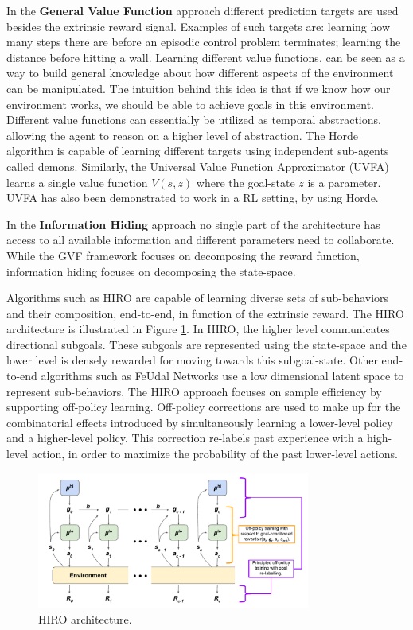 In the \textbf{General Value Function} \cite{Horde} approach different prediction targets are used besides the extrinsic reward signal.
Examples of such targets are: learning how many steps there are
before an episodic control problem terminates; learning the distance before hitting a wall.
Learning different value functions, can be seen as a way to build general knowledge about
how different aspects of the environment can be manipulated. The intuition behind this
idea is that if we know how our environment works, we should be able to achieve
goals in this environment. Different value functions can essentially be utilized as temporal
abstractions, allowing the agent to reason on a higher level of abstraction.
The Horde algorithm \cite{Horde} is capable of learning different targets using independent sub-agents called demons.
Similarly, the Universal Value Function Approximator (UVFA) learns a single value function $V(s, z)$ where the goal-state $z$ is a parameter.
UVFA has also been demonstrated to work in a RL setting, by using Horde.

In the \textbf{Information Hiding} \cite{Feudal_rl} approach no single part of the architecture has access to all available information and different parameters
need to collaborate. While the GVF framework focuses on decomposing the reward function, information hiding focuses on decomposing the state-space.


Algorithms such as HIRO \cite{HIRO} are capable of learning diverse sets of sub-behaviors and their composition, end-to-end, in function
of the extrinsic reward. The HIRO architecture is illustrated in Figure \ref{fig:HIRO}.
In HIRO, the higher level communicates directional subgoals. These subgoals are represented using the state-space and the
lower level is densely rewarded for moving towards this subgoal-state. Other end-to-end algorithms such as FeUdal Networks \cite{FuN}
use a low dimensional latent space to represent sub-behaviors.
The HIRO approach focuses on sample efficiency by supporting off-policy learning. Off-policy corrections are used to
make up for the combinatorial effects introduced by simultaneously learning a lower-level policy and a higher-level policy.
This correction re-labels past experience with a high-level action, in order to maximize the probability of the past lower-level actions.

\begin{figure}
    \centering
    \includegraphics[width=0.8\textwidth]{Images/HIRO.png}
    \caption{HIRO architecture.}
    \label{fig:HIRO}
\end{figure}

